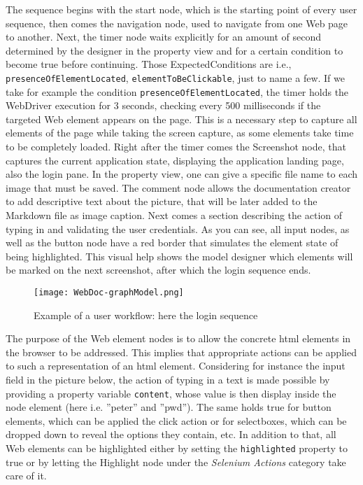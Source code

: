 The sequence begins with the start node, which is the starting point of every user sequence, then comes the navigation node, used to navigate from one Web page to another. Next, the timer node waits explicitly for an amount of second  determined by the designer in the property view and for a certain condition to become true before continuing. Those ExpectedConditions are i.e., \lstinline{presenceOfElementLocated}, \lstinline{elementToBeClickable}, just to name a few. If we take for example the condition \lstinline{presenceOfElementLocated}, the timer holds the WebDriver execution for 3 seconds, checking every 500 milliseconds if the targeted Web element appears on the page. This is a necessary step to capture all elements of the page while taking the screen capture, as some elements take time to be completely loaded. Right after the timer comes the Screenshot node, that captures the current application state, displaying the application landing page, also the login pane. In the property view, one can give a specific file name to each image that must be saved. The comment node allows the documentation creator to add descriptive text about the picture, that will be later added to the Markdown file as image caption. Next comes a section describing the action of typing in and validating the user credentials. As you can see, all input nodes, as well as the button node have a red border that simulates the element state of being highlighted. This visual help shows the model designer which elements will be marked on the next screenshot, after which the login sequence ends.
\begin{figure}[h]
    \centering
    \texttt{[image: WebDoc-graphModel.png]}
    \caption{Example of a user workflow: here the login sequence}
    \label{fig:loginSeq}
\end{figure}

The purpose of the Web element nodes is to allow the concrete \gls*{html} elements in the browser to be addressed. This implies that appropriate actions can be applied to such a representation of an \gls*{html} element. Considering for instance the input field in the picture below, the action of typing in a text is made possible by providing a property variable \lstinline{content}, whose value is then display inside the node element (here i.e. ''peter'' and ''pwd''). The same holds true for button elements, which can be applied the click action or for selectboxes, which can be dropped down to reveal the options they contain, etc. In addition to that, all Web elements can be highlighted either by setting the \lstinline{highlighted} property to true or by letting the Highlight node under the \textit{Selenium Actions} category take care of it. 

